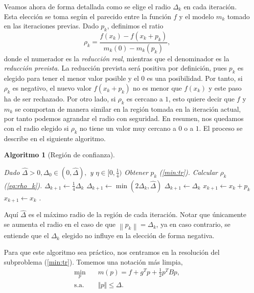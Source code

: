 \documentclass[11pt,a4paper]{book}
\newtheorem{algorithm}[theorem]{Algoritmo}
\theoremstyle{definition}
\theoremstyle{remark}
\newcommand{\norm}[1]{\left\lVert#1\right\rVert}
\begin{document}
Veamos ahora de forma detallada como se elige el radio $\Delta_k$ en cada iteración. Esta elección se toma según el parecido entre la función $f$ y el modelo $m_k$ tomado en las iteraciones previas. Dado $p_k$, definimos el ratio
\begin{equation}
\label{eq:rho_k}
	\rho_k = \frac{f(x_k)-f(x_k+p_k)}{m_k(0)-m_k(p_k)},
\end{equation}
donde el numerador es la \textit{reducción real}, mientras que el denominador es la \textit{reducción prevista}.
La reducción prevista será positiva por definición, pues $p_k$ es elegido para tener el menor valor posible y el $0$ es una posibilidad.
Por tanto, si $\rho_k$ es negativo, el nuevo valor $f(x_k+p_k)$ no es menor que $f(x_k)$ y este paso ha de ser rechazado.
Por otro lado, si $\rho_k$ es cercano a $1$, esto quiere decir que $f$ y $m_k$ se comportan de manera similar en la región tomada en la iteración actual, por tanto podemos agrandar el radio con seguridad.
En resumen, nos quedamos con el radio elegido si $\rho_k$ no tiene un valor muy cercano a $0$ o a $1$.
El proceso se describe en el siguiente algoritmo.
\begin{algorithm}[Región de confianza]\leavevmode
\begin{algorithmic}[1]
\State Dado $\hat{\Delta} > 0,\Delta_0 \in (0,\hat{\Delta}),$ y $\eta \in [0,\frac{1}{4})$
    \State Obtener $p_k$ (\ref{min:tr}).
    \State Calcular $\rho_k$ (\ref{eq:rho_k}).
        \State $\Delta_{k+1} \gets \frac{1}{4}\Delta_k$
    \Else
        \If{$\rho_k > \frac{3}{4}$ y $\norm{p_k} = \Delta_k$}
            \State $\Delta_{k+1} \gets \min(2\Delta_k,\hat{\Delta})$
        \Else
            \State $\Delta_{k+1} \gets \Delta_k$
        \EndIf
    \EndIf
        \State $x_{k+1} \gets x_k + p_k$
    \Else
        \State $x_{k+1} \gets x_k$
    \EndIf
\EndFor.
\end{algorithmic}
\end{algorithm}
Aquí $\hat \Delta$ es el máximo radio de la región de cada iteración.
Notar que únicamente se aumenta el radio en el caso de que $\norm{p_k} = \Delta_k$, ya en caso contrario, se entiende que el $\Delta_k$ elegido no influye en la elección de forma negativa.

Para que este algoritmo sea práctico, nos centramos en la resolución del subproblema (\ref{min:tr}). Tomemos una notación más limpia,
\begin{equation}
\label{min:tr_nk}
\begin{aligned}
	\min_{p} \quad & m(p) = f + g^Tp + \frac{1}{2}p^TBp, \\
	\text{s.a.} \quad & \Vert p \Vert \leq \Delta. \\
\end{aligned}
\end{equation}
\end{document}
